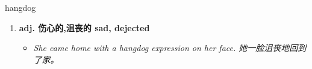 
\begin{frame}
{\huge hangdog}
\begin{center}
\begin{enumerate}\Large
  \item \textbf{adj. 伤心的,沮丧的 sad, dejected}
  \begin{itemize}
    \item \em{\Large{She came home with a hangdog expression on her face. 她一脸沮丧地回到了家。}}
  \end{itemize}
\end{enumerate}
\end{center}
\end{frame}
